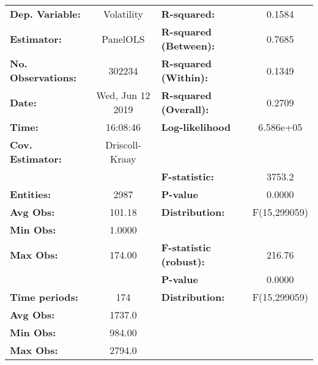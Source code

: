 \begin{center}
\begin{tabular}{lclc}
\toprule
\textbf{Dep. Variable:}                 &     Volatility     & \textbf{  R-squared:         }   &      0.1584      \\
\textbf{Estimator:}                     &      PanelOLS      & \textbf{  R-squared (Between):}  &      0.7685      \\
\textbf{No. Observations:}              &       302234       & \textbf{  R-squared (Within):}   &      0.1349      \\
\textbf{Date:}                          &  Wed, Jun 12 2019  & \textbf{  R-squared (Overall):}  &      0.2709      \\
\textbf{Time:}                          &      16:08:46      & \textbf{  Log-likelihood     }   &    6.586e+05     \\
\textbf{Cov. Estimator:}                &   Driscoll-Kraay   & \textbf{                     }   &                  \\
\textbf{}                               &                    & \textbf{  F-statistic:       }   &      3753.2      \\
\textbf{Entities:}                      &        2987        & \textbf{  P-value            }   &      0.0000      \\
\textbf{Avg Obs:}                       &       101.18       & \textbf{  Distribution:      }   &   F(15,299059)   \\
\textbf{Min Obs:}                       &       1.0000       & \textbf{                     }   &                  \\
\textbf{Max Obs:}                       &       174.00       & \textbf{  F-statistic (robust):} &      216.76      \\
\textbf{}                               &                    & \textbf{  P-value            }   &      0.0000      \\
\textbf{Time periods:}                  &        174         & \textbf{  Distribution:      }   &   F(15,299059)   \\
\textbf{Avg Obs:}                       &       1737.0       & \textbf{                     }   &                  \\
\textbf{Min Obs:}                       &       984.00       & \textbf{                     }   &                  \\
\textbf{Max Obs:}                       &       2794.0       & \textbf{                     }   &                  \\

\end{tabular}
\end{center}
